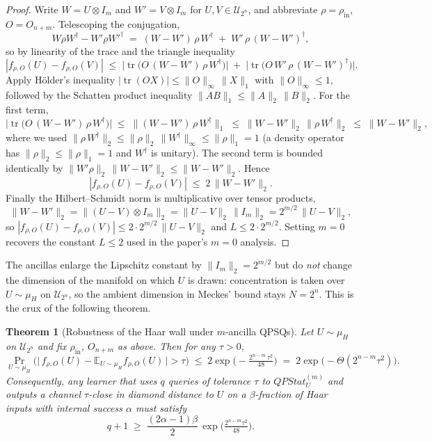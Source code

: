 \documentclass[11pt]{article}
\newtheorem{theorem}{Theorem}
\newcommand{\tr}{\operatorname{tr}}
\begin{document}
\begin{proof}
Write $W = U\otimes I_m$ and $W' = V\otimes I_m$ for $U,V \in \mathcal{U}_{2^n}$,
and abbreviate $\rho = \rho_{\mathrm{in}}$, $O = O_{n+m}$. Telescoping the
conjugation,
\[
  W\rho W^\dagger - W'\rho W'^\dagger
  \;=\;
  (W-W')\,\rho\,W^\dagger \;+\; W'\,\rho\,(W-W')^\dagger ,
\]
so by linearity of the trace and the triangle inequality
\[
  |f_{\rho,O}(U) - f_{\rho,O}(V)|
  \;\le\;
  \big|\tr\!\big(O\,(W-W')\,\rho\,W^\dagger\big)\big|
  \;+\;
  \big|\tr\!\big(O\,W'\,\rho\,(W-W')^\dagger\big)\big| .
\]
Apply H\"older's inequality $|\tr(OX)| \le \|O\|_\infty\,\|X\|_1$ with
$\|O\|_\infty \le 1$, followed by the Schatten product inequality
$\|AB\|_1 \le \|A\|_2\,\|B\|_2$. For the first term,
\[
  \big|\tr\!\big(O\,(W-W')\,\rho\,W^\dagger\big)\big|
  \;\le\;
  \|(W-W')\,\rho\,W^\dagger\|_1
  \;\le\;
  \|W-W'\|_2 \, \|\rho\,W^\dagger\|_2
  \;\le\;
  \|W-W'\|_2 ,
\]
where we used $\|\rho\,W^\dagger\|_2 \le \|\rho\|_2\,\|W^\dagger\|_\infty
\le \|\rho\|_1 = 1$ (a density operator has $\|\rho\|_2 \le \|\rho\|_1 = 1$
and $W^\dagger$ is unitary). The second term is bounded identically by
$\|W'\rho\|_2\,\|W-W'\|_2 \le \|W-W'\|_2$. Hence
\[
  |f_{\rho,O}(U) - f_{\rho,O}(V)| \;\le\; 2\,\|W-W'\|_2 .
\]
Finally the Hilbert--Schmidt norm is multiplicative over tensor products,
\[
  \|W-W'\|_2 = \|(U-V)\otimes I_m\|_2
            = \|U-V\|_2 \, \|I_m\|_2
            = 2^{m/2}\,\|U-V\|_2 ,
\]
so $|f_{\rho,O}(U)-f_{\rho,O}(V)| \le 2\cdot 2^{m/2}\,\|U-V\|_2$ and
$L \le 2\cdot 2^{m/2}$. Setting $m=0$ recovers the constant $L \le 2$ used
in the paper's $m=0$ analysis.
\end{proof}

The ancillas enlarge the Lipschitz constant by $\|I_m\|_2 = 2^{m/2}$ but do
\emph{not} change the dimension of the manifold on which $U$ is drawn:
concentration is taken over $U \sim \mu_H$ on $\mathcal{U}_{2^n}$, so the
ambient dimension in Meckes' bound stays $N = 2^n$. This is the crux of the
following theorem.

\begin{theorem}[Robustness of the Haar wall under $m$-ancilla QPSQs]
\label{thm:haar-wall}
Let $U \sim \mu_H$ on $\mathcal{U}_{2^n}$ and fix $\rho_{\mathrm{in}}$, $O_{n+m}$
as above. Then for any $\tau > 0$,
\[
  \Pr_{U \sim \mu_H}\!\Big(
    \big|\,f_{\rho,O}(U) - \mathbb{E}_{U\sim\mu_H} f_{\rho,O}(U)\,\big| > \tau
  \Big)
  \;\le\;
  2\exp\!\Big(-\tfrac{2^{n-m}\,\tau^2}{48}\Big)
  \;=\;
  2\exp\!\big(-\Theta(2^{n-m}\tau^2)\big).
\]
Consequently, any learner that uses $q$ queries of tolerance $\tau$ to
$QPStat^{(m)}_U$ and outputs a channel $\tau$-close in diamond distance to
$U$ on a $\beta$-fraction of Haar inputs with internal success $\alpha$ must
satisfy
\[
  q + 1 \;\ge\;
  \frac{(2\alpha-1)\beta}{2}\,
  \exp\!\Big(\tfrac{2^{n-m}\tau^2}{48}\Big).
\]
\end{theorem}
\end{document}
